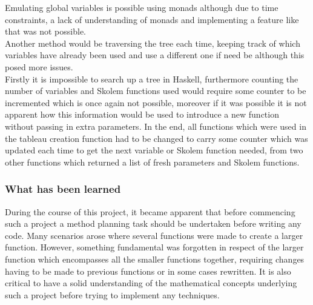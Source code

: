 \documentclass{article}%
\begin{document}
Emulating global variables is possible using monads although due to time constraints, a lack of understanding of monads and implementing a feature like that was not possible. \\ 
Another method would be traversing the tree each time, keeping track of which variables have already been used and use a different one if need be although this posed more issues.\\
 Firstly it is impossible to search up a tree in Haskell, furthermore counting the number of variables and Skolem functions used would require some counter to be incremented which is once again not possible, moreover if it was possible it is not apparent how this information would be used to introduce a new function without passing in extra parameters. In the end, all functions which were used in the tableau creation function had to be changed to carry some counter which was updated each time to get the next variable or Skolem function needed, from two other functions which returned a list of fresh parameters and Skolem functions. 
\subsubsection{What has been learned}
During the course of this project, it became apparent that before commencing such a project a method planning task should be undertaken before writing any code. Many scenarios arose where several functions were made to create a larger function. However, something fundamental was forgotten in respect of the larger function which encompasses all the smaller functions together, requiring changes having to be made to previous functions or in some cases rewritten. It is also critical to have a solid understanding of the mathematical concepts underlying such a project before trying to implement any techniques. 
\end{document}
